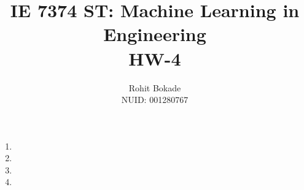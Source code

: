 \documentclass[11pt]{article}
\title{IE 7374 ST: Machine Learning in Engineering \\ HW-4}
\author{Rohit Bokade \\ NUID: 001280767}
\begin{document}
	
	\maketitle 
	
	\begin{enumerate}
	
		\item 
	
		\item 
	
		\item 
	
		\item 	
	
	\end{enumerate}	 
	
\end{document}
